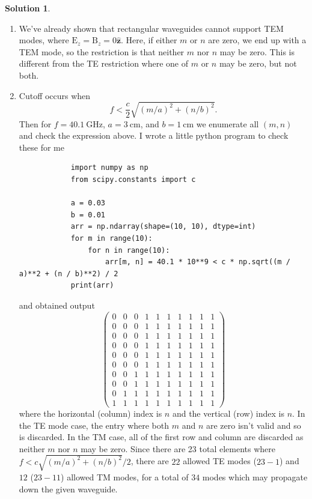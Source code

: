 \documentclass[10pt]{article}
\theoremstyle{definition}
\newtheorem{soln}{Solution}
\newcommand{\uz}{\hat{\mathbf{z}}}
\newcommand{\bv}[1]{\bm{\mathrm{#1}}}
\begin{document}
\begin{soln}~
  \begin{enumerate}[label=(\alph*)]
    \item We've already shown that rectangular waveguides cannot support TEM modes, where $\bv{E}_z=\bv{B}_z=0\uz$. Here, if either
          $m$ or $n$ are zero, we end up with a TEM mode, so the restriction is that neither $m$ nor $n$ may be zero. This is different from the
          TE restriction where one of $m$ or $n$ may be zero, but not both.
    \item Cutoff occurs when
          $$f<\frac{c}{2}\sqrt{(m/a)^2+(n/b)^2}.$$
          Then for $f=\qty{40.1}{\giga\hertz}$, $a=\qty{3}{\centi\meter}$, and $b=\qty{1}{\centi\meter}$
          we enumerate all $(m,n)$ and check the expression above. I wrote a little python program to check these for me
          \begin{verbatim}
            import numpy as np
            from scipy.constants import c

            a = 0.03
            b = 0.01
            arr = np.ndarray(shape=(10, 10), dtype=int)
            for m in range(10):
                for n in range(10):
                    arr[m, n] = 40.1 * 10**9 < c * np.sqrt((m / a)**2 + (n / b)**2) / 2
            print(arr)
          \end{verbatim}
          and obtained output
          $$          \begin{pmatrix}
              0 & 0 & 0 & 1 & 1 & 1 & 1 & 1 & 1 & 1 \\
              0 & 0 & 0 & 1 & 1 & 1 & 1 & 1 & 1 & 1 \\
              0 & 0 & 0 & 1 & 1 & 1 & 1 & 1 & 1 & 1 \\
              0 & 0 & 0 & 1 & 1 & 1 & 1 & 1 & 1 & 1 \\
              0 & 0 & 0 & 1 & 1 & 1 & 1 & 1 & 1 & 1 \\
              0 & 0 & 0 & 1 & 1 & 1 & 1 & 1 & 1 & 1 \\
              0 & 0 & 1 & 1 & 1 & 1 & 1 & 1 & 1 & 1 \\
              0 & 0 & 1 & 1 & 1 & 1 & 1 & 1 & 1 & 1 \\
              0 & 1 & 1 & 1 & 1 & 1 & 1 & 1 & 1 & 1 \\
              1 & 1 & 1 & 1 & 1 & 1 & 1 & 1 & 1 & 1
            \end{pmatrix}$$
          where the horizontal (column) index is $n$ and the vertical (row) index is $n$.
          In the TE mode case, the entry where both $m$ and $n$ are zero isn't valid and so is discarded. In the TM case,
          all of the first row and column are discarded as neither $m$ nor $n$ may be zero. Since there are 23 total elements
          where $f<c\sqrt{(m/a)^2+(n/b)^2}/2$, there are $22$ allowed TE modes ($23-1$) and $12$ ($23-11$) allowed TM modes, for a total of
          $34$ modes which may propagate down the given waveguide.
  \end{enumerate}
\end{soln}
\newpage
\end{document}
